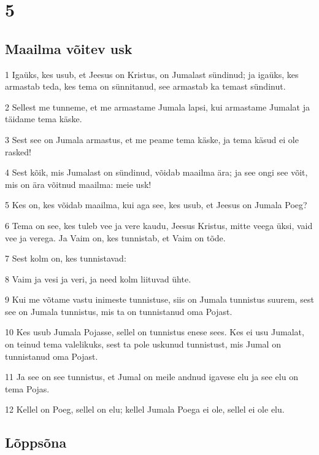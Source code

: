 \chapter{5}

\section*{Maailma võitev usk}

\par 1 Igaüks, kes usub, et Jeesus on Kristus, on Jumalast sündinud; ja igaüks, kes armastab teda, kes tema on sünnitanud, see armastab ka temast sündinut.
\par 2 Sellest me tunneme, et me armastame Jumala lapsi, kui armastame Jumalat ja täidame tema käske.
\par 3 Sest see on Jumala armastus, et me peame tema käske, ja tema käsud ei ole rasked!
\par 4 Sest kõik, mis Jumalast on sündinud, võidab maailma ära; ja see ongi see võit, mis on ära võitnud maailma: meie usk!
\par 5 Kes on, kes võidab maailma, kui aga see, kes usub, et Jeesus on Jumala Poeg?
\par 6 Tema on see, kes tuleb vee ja vere kaudu, Jeesus Kristus, mitte veega üksi, vaid vee ja verega. Ja Vaim on, kes tunnistab, et Vaim on tõde.
\par 7 Sest kolm on, kes tunnistavad:
\par 8 Vaim ja vesi ja veri, ja need kolm liituvad ühte.
\par 9 Kui me võtame vastu inimeste tunnistuse, siis on Jumala tunnistus suurem, sest see on Jumala tunnistus, mis ta on tunnistanud oma Pojast.
\par 10 Kes usub Jumala Pojasse, sellel on tunnistus enese sees. Kes ei usu Jumalat, on teinud tema valelikuks, sest ta pole uskunud tunnistust, mis Jumal on tunnistanud oma Pojast.
\par 11 Ja see on see tunnistus, et Jumal on meile andnud igavese elu ja see elu on tema Pojas.
\par 12 Kellel on Poeg, sellel on elu; kellel Jumala Poega ei ole, sellel ei ole elu.

\section*{Lõppsõna}

